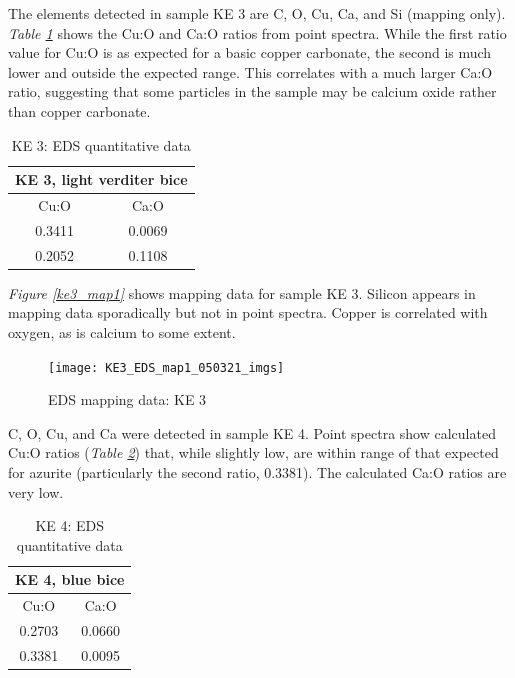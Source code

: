 
The elements detected in sample KE 3 are C, O, Cu, Ca, and Si (mapping only). \textit{Table \ref{table:ke3_ratios}} shows the Cu:O and Ca:O ratios from point spectra. While the first ratio value for Cu:O is as expected for a basic copper carbonate, the second is much lower and outside the expected range. This correlates with a much larger Ca:O ratio, suggesting that some particles in the sample may be calcium oxide rather than copper carbonate.

\begin{table}[H]
\caption{KE 3: EDS quantitative data}
\centering
\label{table:ke3_ratios}
\begin{tabular}{c c}
\toprule
\multicolumn{2}{c}{KE 3, light verditer bice} \\
\midrule
Cu:O & Ca:O \\
\midrule
0.3411 & 0.0069 \\
0.2052 & 0.1108 \\
\bottomrule
\end{tabular}
\end{table}

\textit{Figure \ref{ke3_map1}} shows mapping data for sample KE 3. Silicon appears in mapping data sporadically but not in point spectra. Copper is correlated with oxygen, as is calcium to some extent.

\begin{figure}[H]
\centering
  \texttt{[image: KE3\_EDS\_map1\_050321\_imgs]}
\caption[EDS mapping data: KE 3]{EDS mapping data: KE 3}
\label{fig:ke3_map1}
\end{figure}


C, O, Cu, and Ca were detected in sample KE 4. Point spectra show calculated Cu:O ratios (\textit{Table \ref{table:ke4_ratios}}) that, while slightly low, are within range of that expected for azurite (particularly the second ratio, 0.3381). The calculated Ca:O ratios are very low.

\begin{table}[H]
\caption{KE 4: EDS quantitative data}
\centering
\label{table:ke4_ratios}
\begin{tabular}{c c}
\toprule
\multicolumn{2}{c}{KE 4, blue bice} \\
\midrule
Cu:O & Ca:O \\
\midrule
0.2703 & 0.0660 \\
0.3381 & 0.0095 \\
\bottomrule
\end{tabular}
\end{table}

